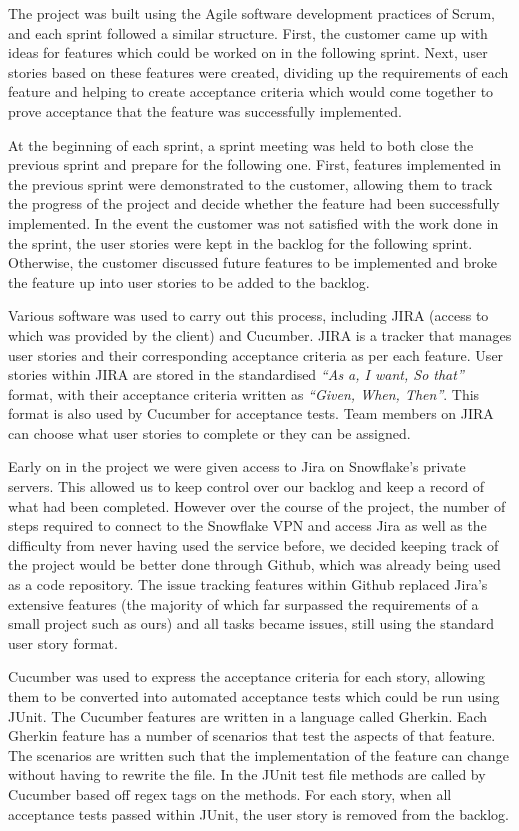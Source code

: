 \documentclass[a4paper, 12pt]{article}
\begin{document}
The project was built using the Agile software development practices of Scrum, and each sprint followed a similar structure. First, the customer came up with ideas for features which could be worked on in the following sprint. Next, user stories based on these features were created, dividing up the requirements of each feature and helping to create acceptance criteria which would come together to prove acceptance that the feature was successfully implemented.

At the beginning of each sprint, a sprint meeting was held to both close the previous sprint and prepare for the following one. First, features implemented in the previous sprint were demonstrated to the customer, allowing them to track the progress of the project and decide whether the feature had been successfully implemented. In the event the customer was not satisfied with the work done in the sprint, the user stories were kept in the backlog for the following sprint. Otherwise, the customer discussed future features to be implemented and broke the feature up into user stories to be added to the backlog.

Various software was used to carry out this process, including JIRA (access to which was provided by the client) and Cucumber. JIRA is a tracker that manages user stories and their corresponding acceptance criteria as per each feature. User stories within JIRA are stored in the standardised \emph{``As a, I want, So that''} format, with their acceptance criteria written as \emph{``Given, When, Then''}. This format is also used by Cucumber for acceptance tests. Team members on JIRA can choose what user stories to complete or they can be assigned.

Early on in the project we were given access to Jira on Snowflake's private servers. This allowed us to keep control over our backlog and keep a record of what had been completed. However over the course of the project, the number of steps required to connect to the Snowflake VPN and access Jira as well as the difficulty from never having used the service before, we decided keeping track of the project would be better done through Github, which was already being used as a code repository. The issue tracking features within Github replaced Jira's extensive features (the majority of which far surpassed the requirements of a small project such as ours) and all tasks became issues, still using the standard user story format.

Cucumber was used to express the acceptance criteria for each story, allowing them to be converted into automated acceptance tests which could be run using JUnit. The Cucumber features are written in a language called Gherkin. Each Gherkin feature has a number of scenarios that test the aspects of that feature. The scenarios are written such that the implementation of the feature can change without having to rewrite the file. In the JUnit test file methods are called by Cucumber based off regex tags on the methods. For each story, when all acceptance tests passed within JUnit, the user story is removed from the backlog.
\end{document}
